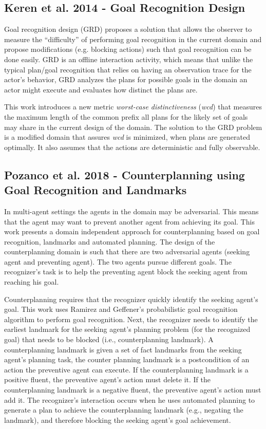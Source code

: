 \subsection{Keren et al. 2014 - Goal Recognition Design}
Goal recognition design (GRD) \cite{keren2014grd} proposes a solution that allows the observer to measure the ``difficulty'' of performing goal recognition in the current domain and propose modifications (e.g. blocking actions) such that goal recognition can be done easily. GRD is an offline interaction activity, which means that unlike the typical plan/goal recognition that relies on having an observation trace for the actor's behavior, GRD analyzes the plans for possible goals in the domain an actor might execute and evaluates how distinct the plans are.

This work introduces a new metric \textit{worst-case distinctiveness} (\textit{wcd}) that measures the maximum length of the common prefix all plans for the likely set of goals may share in the current design of the domain. The solution to the GRD problem is a modified domain that assures \textit{wcd} is minimized, when plans are generated optimally. It also assumes that the actions are deterministic and fully observable.

\subsection{Pozanco et al. 2018 - Counterplanning using Goal Recognition and Landmarks}
In multi-agent settings the agents in the domain may be adversarial. This means that the agent may want to prevent another agent from achieving its goal. 
This work presents a domain independent approach for counterplanning based on goal recognition, landmarks and automated planning. 
The design of the counterplanning domain is such that there are two adversarial agents (seeking agent and preventing agent). 
The two agents pursue different goals. 
The recognizer's task is to help the preventing agent block the seeking agent from reaching his goal.

Counterplanning requires that the recognizer quickly identify the seeking agent's goal. 
This work uses Ramirez and Geffener's probabilistic goal recognition algorithm to perform goal recognition. 
Next, the recognizer needs to identify the earliest landmark for the seeking agent's planning problem (for the recognized goal) that needs to be blocked (i.e., counterplanning landmark). 
A counterplanning landmark is given a set of fact landmarks from the seeking agent's planning task, the counter planning landmark is a postcondition of an action the preventive agent can execute.
If the counterplanning landmark is a positive fluent, the preventive agent's action must delete it.
If the counterplanning landmark is a negative fluent, the preventive agent's action must add it.
The recognizer's interaction occurs when he uses automated planning to generate a plan to achieve the counterplanning landmark (e.g., negating the landmark), and therefore blocking the seeking agent's goal achievement.


